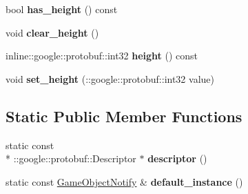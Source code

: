 \begin{DoxyCompactItemize}
\item 
\hypertarget{class_game_object_notify_acb2fd8a9f778bb0c6dc559c757e7c326}{bool {\bfseries has\-\_\-height} () const }\label{class_game_object_notify_acb2fd8a9f778bb0c6dc559c757e7c326}

\item 
\hypertarget{class_game_object_notify_ace893d2ef8f4a322762f85a2ed674ec1}{void {\bfseries clear\-\_\-height} ()}\label{class_game_object_notify_ace893d2ef8f4a322762f85a2ed674ec1}

\item 
\hypertarget{class_game_object_notify_a7af70a9bc8ddcbe3bed697f772a324fc}{inline\-::google\-::protobuf\-::int32 {\bfseries height} () const }\label{class_game_object_notify_a7af70a9bc8ddcbe3bed697f772a324fc}

\item 
\hypertarget{class_game_object_notify_a4075dd8cd90d521540217508f9864503}{void {\bfseries set\-\_\-height} (\-::google\-::protobuf\-::int32 value)}\label{class_game_object_notify_a4075dd8cd90d521540217508f9864503}

\end{DoxyCompactItemize}
\subsection*{Static Public Member Functions}
\begin{DoxyCompactItemize}
\item 
\hypertarget{class_game_object_notify_aaca556ce856cfffb364b49e244fe84d6}{static const \\*
\-::google\-::protobuf\-::\-Descriptor $\ast$ {\bfseries descriptor} ()}\label{class_game_object_notify_aaca556ce856cfffb364b49e244fe84d6}

\item 
\hypertarget{class_game_object_notify_a1638acf0c0d50781c9c6290c78621080}{static const \hyperlink{class_game_object_notify}{Game\-Object\-Notify} \& {\bfseries default\-\_\-instance} ()}\label{class_game_object_notify_a1638acf0c0d50781c9c6290c78621080}

\end{DoxyCompactItemize}
